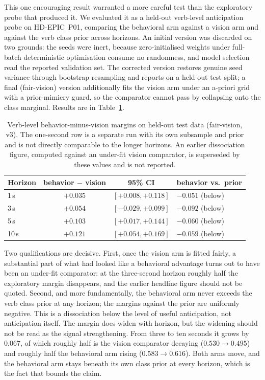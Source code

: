 This one encouraging result warranted a more careful test than the exploratory
probe that produced it. We evaluated it as a held-out verb-level anticipation
probe on HD-EPIC~P01, comparing the behavioral arm against a vision arm and
against the verb class prior across horizons. An initial version was discarded
on two grounds: the seeds were inert, because zero-initialised weights under
full-batch deterministic optimisation consume no randomness, and model selection
read the reported validation set. The corrected version restores genuine seed
variance through bootstrap resampling and reports on a held-out test split; a
final (fair-vision) version additionally fits the vision arm under an a-priori
grid with a prior-mimicry guard, so the comparator cannot pass by collapsing
onto the class marginal. Results are in Table~\ref{tab:dissociation}.

\begin{table}[t]
  \caption{Verb-level behavior-minus-vision margins on held-out test data
  (fair-vision, v3). The one-second row is a separate run with its own subsample
  and prior and is not directly comparable to the longer horizons. An earlier dissociation figure, computed against an under-fit vision comparator, is superseded by these values and is not reported.}
  \label{tab:dissociation}
  \centering
  \begin{tabular}{lccl}
    \toprule
    Horizon & behavior $-$ vision & 95\% CI & behavior vs.\ prior \\
    \midrule
    1\,s  & $+0.035$ & $[+0.008, +0.118]$ & $-0.051$ (below) \\
    3\,s  & $+0.054$ & $[-0.029, +0.099]$ & $-0.092$ (below) \\
    5\,s  & $+0.103$ & $[+0.017, +0.144]$ & $-0.060$ (below) \\
    10\,s & $+0.121$ & $[+0.054, +0.169]$ & $-0.059$ (below) \\
    \bottomrule
  \end{tabular}
\end{table}

Two qualifications are decisive. First, once the vision arm is fitted fairly, a
substantial part of what had looked like a behavioral advantage turns out to have
been an under-fit comparator: at the three-second horizon roughly half the
exploratory margin disappears, and the earlier headline figure should not be
quoted. Second, and
more fundamentally, the behavioral arm never exceeds the verb class prior at any
horizon; the margins against the prior are uniformly negative. This is a
dissociation below the level of useful anticipation, not anticipation itself. The margin does widen with horizon, but the
widening should not be read as the signal strengthening. From three to ten
seconds it grows by $0.067$, of which roughly half is the vision comparator
decaying ($0.530\rightarrow0.495$) and roughly half the behavioral arm rising
($0.583\rightarrow0.616$). Both arms move, and the behavioral arm stays beneath
its own class prior at every horizon, which is the fact that bounds the claim.

